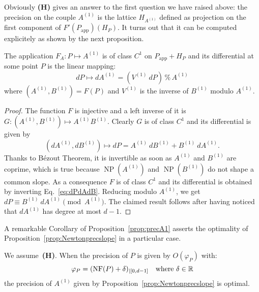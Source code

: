 \documentclass{sig-alternate-2013}
\DeclareMathOperator{\NP}{NP}
\newcommand{\R}{\mathbb R}
\newcommand{\NF}{\text{\rm NF}}
\renewcommand{\mod}{\,\%\,}
\newcommand{\app}{\textrm{app}}
\begin{document}
\bigskip

\noindent
Obviously \textbf{(H)} gives an answer to the first question we have 
raised above: the precision on the couple $A^{(1)}$ is the lattice 
$H_{A^{(1)}}$ defined as projection on the first component of 
$F'(P_\app)(H_P)$. It turns out that it can be computed explicitely as 
shown by the next proposition.

\begin{prop}
\label{prop:precA1}
The application $F_A : P \mapsto A^{(1)}$ is of class $C^1$ on $P_\app + H_P$
and its differential at some point $P$ is the linear mapping:
$$dP \mapsto dA^{(1)} = (V^{(1)} \: dP) \mod A^{(1)}$$
where $(A^{(1)}, B^{(1)}) = F(P)$ and $V^{(1)}$ is the inverse of 
$B^{(1)}$ modulo $A^{(1)}$.
\end{prop}

\begin{proof}
The function $F$ is injective and a left inverse of it is
$G : (A^{(1)},B^{(1)}) \mapsto A^{(1)}B^{(1)}$.
Clearly $G$ is of class $C^1$ and its differential is given by
\begin{equation}
\label{eq:dPdAdB}
(dA^{(1)}, dB^{(1)}) \mapsto dP = A^{(1)} \: dB^{(1)} + B^{(1)} \: dA^{(1)}.
\end{equation}
Thanks to Bézout Theorem, it is invertible as soon as $A^{(1)}$ and 
$B^{(1)}$ are coprime, which is true because $\NP(A^{(1)})$ and 
$\NP(B^{(1)})$ do not shape a common slope. As a consequence $F$ is of 
class $C^1$ and its differential is obtained by inverting 
Eq.~\eqref{eq:dPdAdB}. Reducing modulo $A^{(1)}$, we get $dP \equiv 
B^{(1)} \: dA^{(1)} \pmod {A^{(1)}}$. The claimed result follows after 
having noticed that $dA^{(1)}$ has degree at most $d{-}1$.
\end{proof}

A remarkable Corollary of Proposition~\ref{prop:precA1} asserts the
optimality of Proposition~\ref{prop:Newtonprecslope} in a particular 
case.

\begin{cor}
We assume~\textbf{(H)}.
When the precision of $P$ is given by $O(\varphi_P)$ with:
$$\varphi_P = (\NF(P) + \delta)_{|[0,d-1]}
\quad \text{where $\delta \in \R$}$$
the precision of $A^{(1)}$ given by 
Proposition~\ref{prop:Newtonprecslope} is optimal.
\end{cor}
\end{document}
